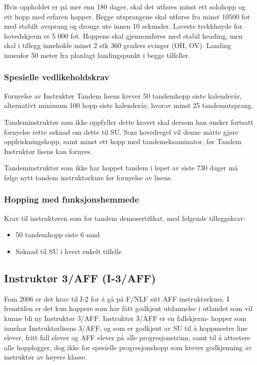 Hvis oppholdet er på mer enn 180 dager, skal det utføres minst ett solohopp og ett hopp med erfaren hopper. Begge utsprangene skal utføres fra minst 10500 fot med stabilt avsprang og drouge ute innen 10 sekunder. Laveste trekkhøyde for hovedskjerm er 5 000 fot. Hoppene skal gjennomføres med stabil heading, men skal i tillegg inneholde minst 2 stk 360 graders svinger (OH, OV). Landing innenfor 50 meter fra planlagt landingspunkt i begge tilfeller.

\subsubsection{Spesielle vedlikeholdskrav}
Fornyelse av Instruktør Tandem lisens krever 50 tandemhopp siste kalenderår, alternativt minimum 100 hopp siste kalenderår, hvorav minst 25 tandemutsprang.

Tandeminstruktør som ikke oppfyller dette kravet skal dersom han ønsker fortsatt fornyelse rette søknad om dette til SU. Som hovedregel vil denne måtte gjøre oppfriskningshopp, samt minst ett hopp med tandemeksaminator, før Tandem Instruktør lisens kan fornyes.

Tandeminstruktør som ikke har hoppet tandem i løpet av siste 730 dager må følge nytt tandem instruktørkurs før fornyelse av lisens.

\subsubsection{Hopping med funksjonshemmede}
Krav til instruktøren som for tandem demosertifikat, med følgende tilleggskrav:
\begin{itemize}
	\item 50 tandemhopp siste 6 mnd
	\item Søknad til SU i hvert enkelt tilfelle
\end{itemize}

\subsection{Instruktør 3/AFF (I-3/AFF)}
Fom 2006 er det krav til I-2 for å gå på F/NLF sitt AFF instruktørkurs. I fremtiden er det kun hoppere som har fått godkjent utdannelse i utlandet som vil kunne bli ny Instruktør 3/AFF. Instruktør 3/AFF er en fallskjerm- hopper som innehar Instruktørlisens 3/AFF, og som er godkjent av SU til å hoppmestre line elever, fritt fall elever og AFF elever på alle progresjonstrinn, samt til å attestere alle hopplogger, dog ikke for spesielle progresjonshopp som krever godkjenning av instruktør av høyere klasse.

